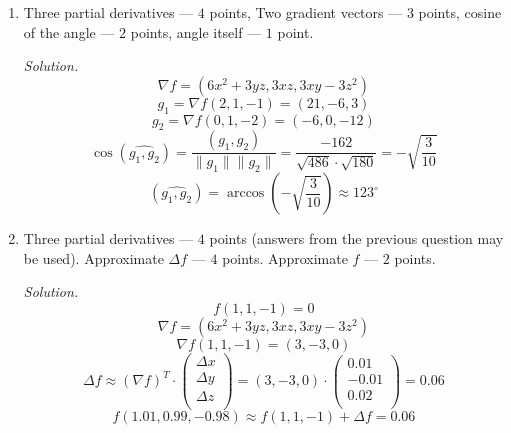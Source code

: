 \documentclass[12pt]{article} %
\theoremstyle{definition} %
\begin{document}
\begin{enumerate}
\item Three partial derivatives --- $4$ points, Two gradient vectors --- $3$ points, cosine of the angle --- $2$ points, angle itself --- $1$ point.

\textit{Solution.}
\begin{equation*}\nabla f = (6 x^2+3 y z,3 x z,3 x y-3 z^2)\end{equation*}
\begin{equation*}g_1 = \nabla f(2,1,-1) = (21,-6,3)\end{equation*}
\begin{equation*}g_2 = \nabla f(0,1,-2) = (-6,0,-12)\end{equation*}
\begin{equation*}
\cos (\widehat{g_1,g_2}) = \frac {(g_1,g_2)}{\|g_1\|\|g_2\|} = \frac{-162}{\sqrt{486} \cdot \sqrt{180}}=-\sqrt{\frac{3}{10}}
\end{equation*}
\begin{equation*}
 (\widehat{g_1,g_2})  = \arccos(-\sqrt{\frac{3}{10}}) \approx 123 ^\circ
\end{equation*}

\item Three partial derivatives --- $4$ points (answers from the previous question may be used). Approximate $\Delta f$ --- $4$ points. Approximate $f$ --- $2$ points.

\textit{Solution.}
\begin{equation*}
f(1,1,-1) = 0
\end{equation*}
\begin{equation*}\nabla f = (6 x^2+3 y z,3 x z,3 x y-3 z^2)\end{equation*}
\begin{equation*}
\nabla f(1,1,-1) = (3,-3,0)
\end{equation*}
\begin{equation*}
\Delta f \approx (\nabla f)^T \cdot \left( \begin{array}{c}
\Delta x\\
\Delta y\\
\Delta z\\
\end{array}
\right)
 =\left(3,-3,0 \right)   \cdot \left( \begin{array}{c}
0.01\\
-0.01\\
0.02\\
\end{array}
\right) = 0.06
\end{equation*}
\begin{equation*}
f(1.01, 0.99, -0.98) \approx f(1,1,-1) +\Delta f =0.06
\end{equation*}



\end{enumerate}
\end{document}
